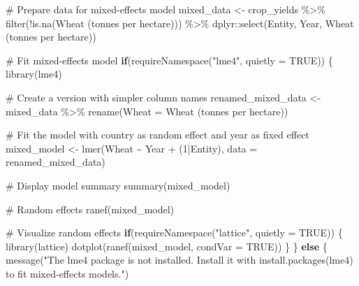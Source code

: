 \documentclass[
  letterpaper,
]{book}
\newenvironment{Shaded}{\begin{snugshade}}{\end{snugshade}}
\newcommand{\AttributeTok}[1]{\textcolor[rgb]{0.40,0.45,0.13}{#1}}
\newcommand{\CommentTok}[1]{\textcolor[rgb]{0.37,0.37,0.37}{#1}}
\newcommand{\ConstantTok}[1]{\textcolor[rgb]{0.56,0.35,0.01}{#1}}
\newcommand{\ControlFlowTok}[1]{\textcolor[rgb]{0.00,0.23,0.31}{\textbf{#1}}}
\newcommand{\DecValTok}[1]{\textcolor[rgb]{0.68,0.00,0.00}{#1}}
\newcommand{\FunctionTok}[1]{\textcolor[rgb]{0.28,0.35,0.67}{#1}}
\newcommand{\NormalTok}[1]{\textcolor[rgb]{0.00,0.23,0.31}{#1}}
\newcommand{\OtherTok}[1]{\textcolor[rgb]{0.00,0.23,0.31}{#1}}
\newcommand{\SpecialCharTok}[1]{\textcolor[rgb]{0.37,0.37,0.37}{#1}}
\newcommand{\StringTok}[1]{\textcolor[rgb]{0.13,0.47,0.30}{#1}}
\begin{document}
\begin{Shaded}
\begin{Highlighting}[]
\CommentTok{\# Prepare data for mixed{-}effects model}
\NormalTok{mixed\_data }\OtherTok{\textless{}{-}}\NormalTok{ crop\_yields }\SpecialCharTok{\%\textgreater{}\%}
  \FunctionTok{filter}\NormalTok{(}\SpecialCharTok{!}\FunctionTok{is.na}\NormalTok{(}\StringTok{\textasciigrave{}}\AttributeTok{Wheat (tonnes per hectare)}\StringTok{\textasciigrave{}}\NormalTok{)) }\SpecialCharTok{\%\textgreater{}\%}
\NormalTok{  dplyr}\SpecialCharTok{::}\FunctionTok{select}\NormalTok{(Entity, Year, }\StringTok{\textasciigrave{}}\AttributeTok{Wheat (tonnes per hectare)}\StringTok{\textasciigrave{}}\NormalTok{)}

\CommentTok{\# Fit mixed{-}effects model}
\ControlFlowTok{if}\NormalTok{(}\FunctionTok{requireNamespace}\NormalTok{(}\StringTok{"lme4"}\NormalTok{, }\AttributeTok{quietly =} \ConstantTok{TRUE}\NormalTok{)) \{}
  \FunctionTok{library}\NormalTok{(lme4)}
  
  \CommentTok{\# Create a version with simpler column names}
\NormalTok{  renamed\_mixed\_data }\OtherTok{\textless{}{-}}\NormalTok{ mixed\_data }\SpecialCharTok{\%\textgreater{}\%}
    \FunctionTok{rename}\NormalTok{(}\AttributeTok{Wheat =} \StringTok{\textasciigrave{}}\AttributeTok{Wheat (tonnes per hectare)}\StringTok{\textasciigrave{}}\NormalTok{)}
  
  \CommentTok{\# Fit the model with country as random effect and year as fixed effect}
\NormalTok{  mixed\_model }\OtherTok{\textless{}{-}} \FunctionTok{lmer}\NormalTok{(Wheat }\SpecialCharTok{\textasciitilde{}}\NormalTok{ Year }\SpecialCharTok{+}\NormalTok{ (}\DecValTok{1}\SpecialCharTok{|}\NormalTok{Entity), }\AttributeTok{data =}\NormalTok{ renamed\_mixed\_data)}
  
  \CommentTok{\# Display model summary}
  \FunctionTok{summary}\NormalTok{(mixed\_model)}
  
  \CommentTok{\# Random effects}
  \FunctionTok{ranef}\NormalTok{(mixed\_model)}
  
  \CommentTok{\# Visualize random effects}
  \ControlFlowTok{if}\NormalTok{(}\FunctionTok{requireNamespace}\NormalTok{(}\StringTok{"lattice"}\NormalTok{, }\AttributeTok{quietly =} \ConstantTok{TRUE}\NormalTok{)) \{}
    \FunctionTok{library}\NormalTok{(lattice)}
    \FunctionTok{dotplot}\NormalTok{(}\FunctionTok{ranef}\NormalTok{(mixed\_model, }\AttributeTok{condVar =} \ConstantTok{TRUE}\NormalTok{))}
\NormalTok{  \}}
\NormalTok{\} }\ControlFlowTok{else}\NormalTok{ \{}
  \FunctionTok{message}\NormalTok{(}\StringTok{"The \textquotesingle{}lme4\textquotesingle{} package is not installed. Install it with install.packages(\textquotesingle{}lme4\textquotesingle{}) to fit mixed{-}effects models."}\NormalTok{)}
  

\end{Highlighting}
\end{Shaded}
\end{document}

